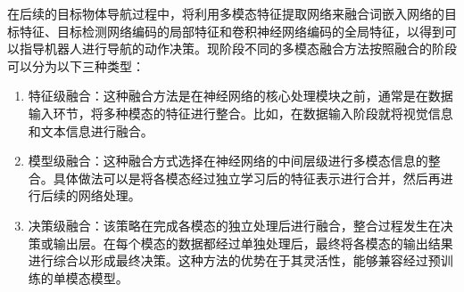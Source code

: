 在后续的目标物体导航过程中，将利用多模态特征提取网络来融合词嵌入网络的目标特征、目标检测网络编码的局部特征和卷积神经网络编码的全局特征，以得到可以指导机器人进行导航的动作决策。现阶段不同的多模态融合方法按照融合的阶段可以分为以下三种类型：
\begin{enumerate}[topsep = 0 pt, itemsep= 0 pt, parsep=0pt, partopsep=0pt, leftmargin=44pt, itemindent=0pt, labelsep=6pt, label=(\arabic*)]
    \item 	特征级融合：这种融合方法是在神经网络的核心处理模块之前，通常是在数据输入环节，将多种模态的特征进行整合。比如，在数据输入阶段就将视觉信息和文本信息进行融合。
    \item	模型级融合：这种融合方式选择在神经网络的中间层级进行多模态信息的整合。具体做法可以是将各模态经过独立学习后的特征表示进行合并，然后再进行后续的网络处理。
    \item	决策级融合：该策略在完成各模态的独立处理后进行融合，整合过程发生在决策或输出层。在每个模态的数据都经过单独处理后，最终将各模态的输出结果进行综合以形成最终决策。这种方法的优势在于其灵活性，能够兼容经过预训练的单模态模型。
\end{enumerate}

